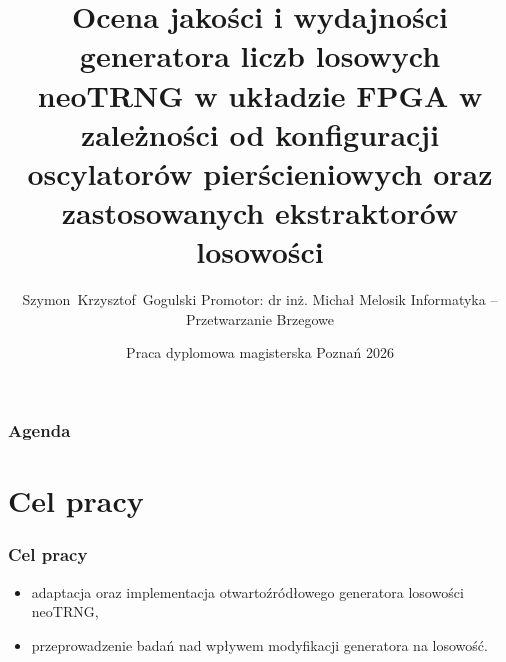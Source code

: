 \documentclass{beamer}
\title[Praca dyplomowa magisterska] %
{Ocena jakości i wydajności generatora liczb losowych neoTRNG w układzie FPGA w zależności od konfiguracji oscylatorów pierścieniowych oraz zastosowanych ekstraktorów losowości}
\subtitle{}
\author[Szymon Gogulski] %
{Szymon~Krzysztof~Gogulski
\newline
\newline
Promotor: dr inż. Michał Melosik
\newline
\newline
Informatyka – Przetwarzanie Brzegowe
}
\institute[PP] %
{Politechnika Poznańska}
\date[Poznań 2026] %
{Praca dyplomowa magisterska
\newline
Poznań 2026}
\begin{document}
\frame{\titlepage}
\begin{frame}
\frametitle{Agenda}
\tableofcontents
\end{frame}
\section{Cel pracy}
\begin{frame}
\frametitle{Cel pracy}

\LARGE

\begin{itemize}
    \item adaptacja oraz implementacja otwartoźródłowego generatora losowości neoTRNG,
    \item przeprowadzenie badań nad wpływem modyfikacji generatora na losowość.
\end{itemize}

\end{frame}
\end{document}
